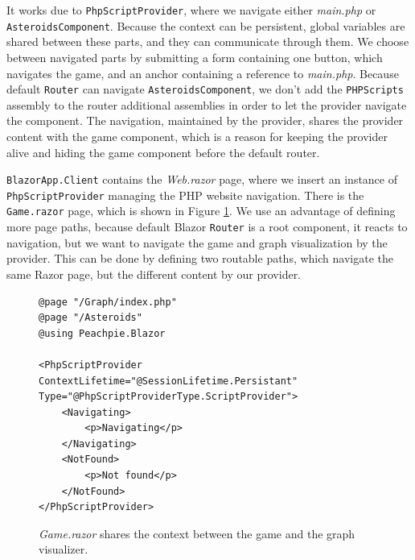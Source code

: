 It works due to \texttt{PhpScriptProvider}, where we navigate either \textit{main.php} or \texttt{AsteroidsComponent}.
Because the context can be persistent, global variables are shared between these parts, and they can communicate through them.
We choose between navigated parts by submitting a form containing one button, which navigates the game, and an anchor containing a reference to \textit{main.php}.
Because default \texttt{Router} can navigate \texttt{AsteroidsComponent}, we don't add the \texttt{PHPScripts} assembly to the router additional assemblies in order to let the provider navigate the component.
The navigation, maintained by the provider, shares the provider content with the game component, which is a reason for keeping the provider alive and hiding the game component before the default router.
\par
\texttt{BlazorApp.Client} contains the \textit{Web.razor} page, where we insert an instance of \texttt{PhpScriptProvider} managing the PHP website navigation.
There is the \texttt{Game.razor} page, which is shown in Figure \ref{img29:razor}.
We use an advantage of defining more page paths, because default Blazor \texttt{Router} is a root component, it reacts to navigation, but we want to navigate the game and graph visualization by the provider.
This can be done by defining two routable paths, which navigate the same Razor page, but the different content by our provider.
\par
\begin{figure}[b!]
\begin{lstlisting}
@page "/Graph/index.php"
@page "/Asteroids"
@using Peachpie.Blazor

<PhpScriptProvider ContextLifetime="@SessionLifetime.Persistant" 
Type="@PhpScriptProviderType.ScriptProvider">
    <Navigating>
        <p>Navigating</p>
    </Navigating>
    <NotFound>
        <p>Not found</p>
    </NotFound>
</PhpScriptProvider>
\end{lstlisting}
\caption{\textit{Game.razor} shares the context between the game and the graph visualizer.}
\label{img29:razor}
\end{figure}
